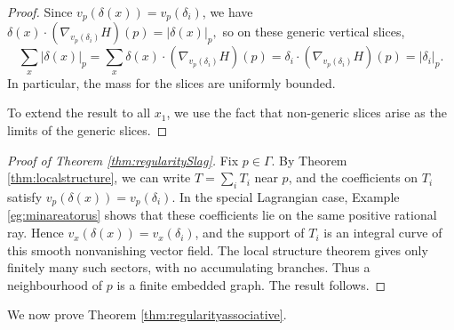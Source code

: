 \documentclass{article}
\theoremstyle{definition}
\begin{document}
\begin{proof}
			
			
		Since $v_p(\delta(x))=v_p(\delta_i)$, we have
$
			\delta(x)\cdot (\nabla_{v_p(\delta_i)} H)(p) = |\delta(x) |_p,
		$
			so on these generic vertical slices,
			\[
			\sum_x  |\delta(x)|_p = \sum_x 	\delta(x)\cdot (\nabla_{v_p(\delta_i)} H)(p)= \delta_i\cdot  (\nabla_{v_p(\delta_i) } H)(p)= |\delta_i|_p.
			\]
			In  particular, the mass for the slices are uniformly bounded.
			
			
			To extend the result to all $x_1$, we use the fact that non-generic slices arise as  the limits of the generic slices.
			\end{proof}
			
			
	

	\begin{proof}[Proof of Theorem \ref{thm:regularitySlag}]
		Fix $p\in\Gamma$. By Theorem \ref{thm:localstructure}, we can write $T=\sum_iT_i$ near $p$, and the coefficients on $T_i$ satisfy $v_p(\delta(x))=v_p(\delta_i)$. In the special Lagrangian case, Example \ref{eg:minareatorus} shows that these coefficients lie on the same positive rational ray. Hence $v_x(\delta(x))=v_x(\delta_i)$, and the support of $T_i$ is an integral curve of this smooth nonvanishing vector field. The local structure theorem gives only finitely many such sectors, with no accumulating branches. Thus a neighbourhood of $p$ is a finite embedded graph. The result follows.
	\end{proof}



We now prove Theorem \ref{thm:regularityassociative}. %
\end{document}

